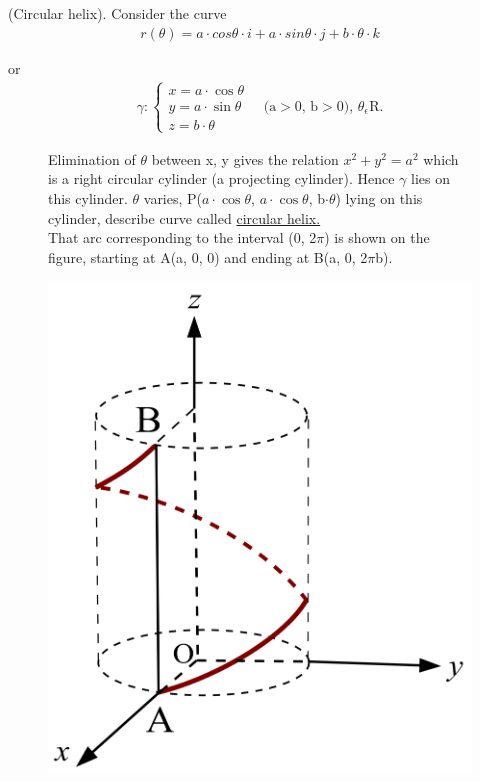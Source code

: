 \documentclass[11pt]{amsbook}
\begin{document}

\begin{exmp}
(Circular helix). Consider the curve
    \begin{align*}
        r(\theta) = a\cdot cos\theta \cdot i + a \cdot sin\theta \cdot j + b \cdot \theta \cdot k 
    \end{align*}
        \par or 
    \begin{align*}
        \gamma :  \left \{ \begin{array}{lr}
        x = a \cdot \cos\theta\\
        y = a \cdot \sin\theta\\
        z = b \cdot \theta
        \end{array}\right. \quad \text{(a$>$0, b$>$0),  $\theta_\epsilon$R.}
    \end{align*}
\begin{figure}[htbp]
\begin{minipage}{0.60\linewidth}
Elimination of $\theta$ between x, y gives the relation $x^2 + y^2 = a^2$ which is a right circular cylinder (a projecting cylinder). Hence $\gamma$ lies on this cylinder. $\theta$ varies, P($a\cdot \cos \theta$, $a\cdot \cos \theta$, b$\cdot \theta$) lying on this cylinder, describe curve called \underline{circular helix.} \\
That arc corresponding to the interval (0, 2$\pi$) is shown on the figure, starting at A(a, 0, 0) and ending at B(a, 0, 2$\pi$b). 
\end{minipage}
\begin{minipage}{0.35\linewidth}
    \centering
    \includegraphics[width=0.85\linewidth]{images/helix.png} 

\end{minipage}
\end{figure}
\end{exmp}
\end{document}
